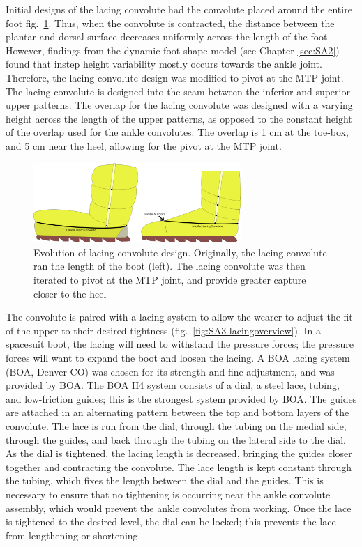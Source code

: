 \documentclass[defaultstyle,11pt]{thesis}
\begin{document}
Initial designs of the lacing convolute had the convolute placed around the entire foot fig.~\ref{fig:SA3-lacingevo}.
Thus, when the convolute is contracted, the distance between the plantar and dorsal surface decreases uniformly across the length of the foot.
However, findings from the dynamic foot shape model (see Chapter \ref{sec:SA2}) found that instep height variability mostly occurs towards the ankle joint.
Therefore, the lacing convolute design was modified to pivot at the MTP joint.
The lacing convolute is designed into the seam between the inferior and superior upper patterns.
The overlap for the lacing convolute was designed with a varying height across the length of the upper patterns, as opposed to the constant height of the overlap used for the ankle convolutes.
The overlap is 1 cm at the toe-box, and 5 cm near the heel, allowing for the pivot at the MTP joint.

\begin{figure}
\hypertarget{fig:SA3-lacingevo}{%
\centering
\includegraphics[width=0.7\textwidth,height=\textheight]{../fig/SA3/LacingConvolute_evolution.png}
\caption{Evolution of lacing convolute design. Originally, the lacing convolute ran the length of the boot (left). The lacing convolute was then iterated to pivot at the MTP joint, and provide greater capture closer to the heel}\label{fig:SA3-lacingevo}
}
\end{figure}

The convolute is paired with a lacing system to allow the wearer to adjust the fit of the upper to their desired tightness (fig.~\ref{fig:SA3-lacingoverview}).
In a spacesuit boot, the lacing will need to withstand the pressure forces; the pressure forces will want to expand the boot and loosen the lacing.
A BOA lacing system (BOA, Denver CO) was chosen for its strength and fine adjustment, and was provided by BOA.
The BOA H4 system consists of a dial, a steel lace, tubing, and low-friction guides; this is the strongest system provided by BOA.
The guides are attached in an alternating pattern between the top and bottom layers of the convolute.
The lace is run from the dial, through the tubing on the medial side, through the guides, and back through the tubing on the lateral side to the dial.
As the dial is tightened, the lacing length is decreased, bringing the guides closer together and contracting the convolute.
The lace length is kept constant through the tubing, which fixes the length between the dial and the guides.
This is necessary to ensure that no tightening is occurring near the ankle convolute assembly, which would prevent the ankle convolutes from working.
Once the lace is tightened to the desired level, the dial can be locked; this prevents the lace from lengthening or shortening.
\end{document}
